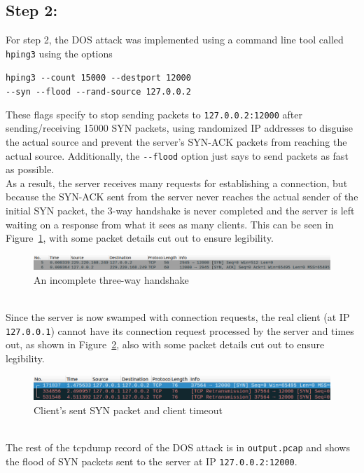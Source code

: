 \documentclass[11pt]{article}
\begin{document}
\subsection*{Step 2:}
For step 2, the DOS attack was implemented using a command line tool called \verb|hping3| using
the options
\begin{center}
  \verb|hping3 --count 15000 --destport 12000|\\
  \verb|--syn --flood --rand-source 127.0.0.2|
\end{center}
These flags specify to stop sending packets to \verb|127.0.0.2:12000| after sending/receiving 15000
SYN packets, using randomized IP addresses to disguise the actual source and prevent the
server's SYN-ACK packets from reaching the actual source. Additionally, the \verb|--flood|
option just says to send packets as fast as possible.\\
As a result, the server receives many requests for establishing a connection, but because the
SYN-ACK sent from the server never reaches the actual sender of the initial SYN packet, the
3-way handshake is never completed and the server is left waiting on a response from what it
sees as many clients. This can be seen in Figure~\ref{fig:handshake}, with some packet details
cut out to ensure legibility.
\begin{figure}[htbp]
  \centering
  \includegraphics[width=1\linewidth]{./incomplete_handshake.png}
  \caption{\label{fig:handshake}
  An incomplete three-way handshake}
\end{figure}
\\
Since the server is now swamped with connection requests, the real client (at IP \verb|127.0.0.1|)
cannot have its connection request processed by the server and times out, as shown in
Figure~\ref{fig:timeout}, also with some packet details cut out to ensure legibility.
\begin{figure}[htbp]
  \centering
  \includegraphics[width=1\linewidth]{./client_timeout.png}
  \caption{\label{fig:timeout}
  Client's sent SYN packet and client timeout}
\end{figure}
\\
The rest of the tcpdump record of the DOS attack is in \verb|output.pcap| and shows the flood
of SYN packets sent to the server at IP \verb|127.0.0.2:12000|.
\end{document}
